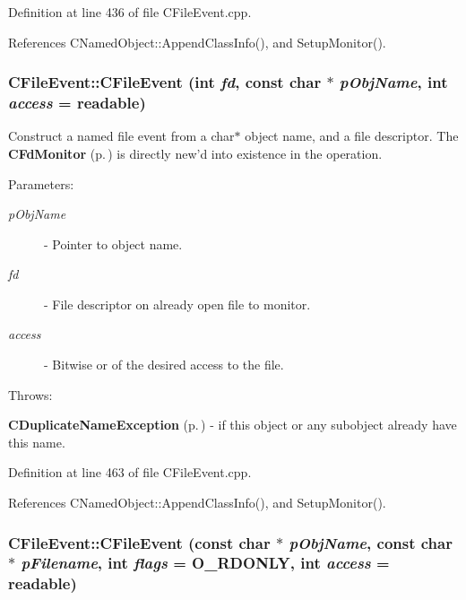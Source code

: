 Definition at line 436 of file CFile\-Event.cpp.

References CNamed\-Object::Append\-Class\-Info(), and Setup\-Monitor().
\subsubsection{\setlength{\rightskip}{0pt plus 5cm}CFile\-Event::CFile\-Event (int {\em fd}, const char $\ast$ {\em p\-Obj\-Name}, int {\em access} = {\bf readable})}\label{classCFileEvent_a3}


Construct a named file event from a char$\ast$ object name, and a file descriptor. The {\bf CFd\-Monitor} {\rm (p.\,\pageref{classCFdMonitor})} is directly new'd into existence in the operation. \begin{Desc}
\item[Parameters: ]\par
\begin{description}
\item[{\em 
p\-Obj\-Name}]- Pointer to object name. \item[{\em 
fd}]- File descriptor on already open file to monitor. \item[{\em 
access}]- Bitwise or of the desired access to the file.\end{description}
\end{Desc}
Throws:\begin{CompactItemize}
\item 
{\bf CDuplicate\-Name\-Exception} {\rm (p.\,\pageref{classCDuplicateNameException})} - if this object or any subobject already have this name. \end{CompactItemize}


Definition at line 463 of file CFile\-Event.cpp.

References CNamed\-Object::Append\-Class\-Info(), and Setup\-Monitor().
\subsubsection{\setlength{\rightskip}{0pt plus 5cm}CFile\-Event::CFile\-Event (const char $\ast$ {\em p\-Obj\-Name}, const char $\ast$ {\em p\-Filename}, int {\em flags} = O\_\-RDONLY, int {\em access} = {\bf readable})}\label{classCFileEvent_a4}


